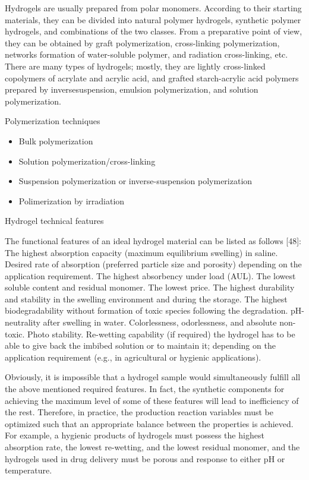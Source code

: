 \documentclass[../../main-notes.tex]{subfiles}
\begin{document}
Hydrogels are usually prepared from polar monomers. 
According to their starting materials, they can be divided into natural polymer hydrogels, synthetic polymer hydrogels, and combinations of the two classes. 
From a preparative point of view, they can be obtained by graft polymerization, cross-linking polymerization, networks formation of water-soluble polymer, and radiation cross-linking, etc. 
There are many types of hydrogels; mostly, they are lightly cross-linked copolymers of acrylate and acrylic acid, and grafted starch-acrylic acid polymers prepared by inversesuspension, emulsion polymerization, and solution polymerization. 


Polymerization techniques

\begin{itemize}
    \item Bulk polymerization
    \item Solution polymerization/cross-linking
    \item Suspension polymerization or inverse-suspension polymerization 
    \item Polimerization by irradiation 
\end{itemize}


Hydrogel technical features  

The functional features of an ideal hydrogel material can be listed as follows [48]:  
The highest absorption capacity (maximum equilibrium swelling) in saline. 
Desired rate of absorption (preferred particle size and porosity) depending on the application requirement. 
The highest absorbency under load (AUL). 
The lowest soluble content and residual monomer. 
The lowest price. 
The highest durability and stability in the swelling environment and during the storage. 
The highest biodegradability without formation of toxic species following the degradation. pH-neutrality after swelling in water. 
Colorlessness, odorlessness, and absolute non-toxic. 
Photo stability. 
Re-wetting capability (if required) the hydrogel has to be able to give back the imbibed solution or to maintain it; depending on the application requirement (e.g., in agricultural or hygienic applications).  

Obviously, it is impossible that a hydrogel sample would simultaneously fulfill all the above mentioned required features. 
In fact, the synthetic components for achieving the maximum level of some of these features will lead to inefficiency of the rest. 
Therefore, in practice, the production reaction variables must be optimized such that an appropriate balance between the properties is achieved. 
For example, a hygienic products of hydrogels must possess the highest absorption rate, the lowest re-wetting, and the lowest residual monomer, and the hydrogels used in drug delivery must be porous and response to either pH or temperature.
\end{document}

